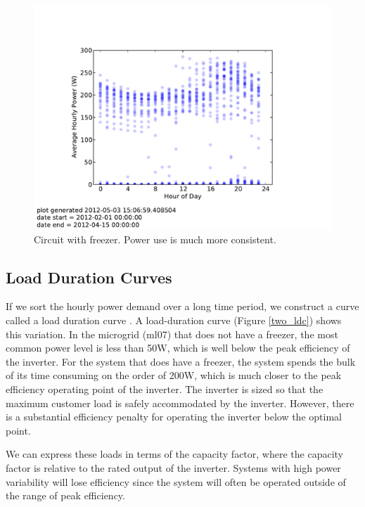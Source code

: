 \documentclass[conference]{IEEEtran}
\begin{document}
\begin{figure}[]
\begin{center}
\includegraphics[trim = 0.7in 0.8in 0.7in 1.1in, clip, width=\columnwidth]{figures/freezer_profile.pdf}
\end{center}
\caption{Circuit with freezer.  
Power use is much more consistent.}
\label{freezer}
\end{figure}

\subsection{Load Duration Curves}
If we sort the hourly power demand over a long time period, we
construct a curve called a load duration curve \cite{REEPS}.
A load-duration curve (Figure \ref{two_ldc}) shows this variation.
In the microgrid (ml07) that does not have a freezer, the most common
power level is less than 50W, which is well below the peak
efficiency of the inverter.
For the system that does have a freezer, the system spends the bulk
of its time consuming on the order of 200W, which is much closer
to the peak efficiency operating point of the inverter.
The inverter is sized so that the maximum customer load is safely
accommodated by the inverter.
However, there is a substantial efficiency penalty for operating the
inverter below the optimal point.

We can express these loads in terms of the capacity factor,
where the capacity factor is relative to the rated output
of the inverter.
Systems with high power variability will lose efficiency since
the system will often be operated outside of the range of
peak efficiency.
\end{document}
